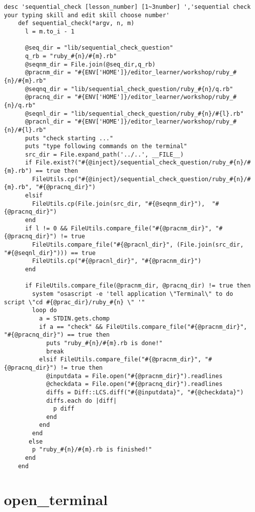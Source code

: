 \begin{verbatim}
desc 'sequential_check [lesson_number] [1~3number] ','sequential check your typing skill and edit skill choose number'
    def sequential_check(*argv, n, m)
      l = m.to_i - 1
     
      @seq_dir = "lib/sequential_check_question"
      q_rb = "ruby_#{n}/#{m}.rb"
      @seqnm_dir = File.join(@seq_dir,q_rb)
      @pracnm_dir = "#{ENV['HOME']}/editor_learner/workshop/ruby_#{n}/#{m}.rb"
      @seqnq_dir = "lib/sequential_check_question/ruby_#{n}/q.rb"
      @pracnq_dir = "#{ENV['HOME']}/editor_learner/workshop/ruby_#{n}/q.rb"      
      @seqnl_dir = "lib/sequential_check_question/ruby_#{n}/#{l}.rb"
      @pracnl_dir = "#{ENV['HOME']}/editor_learner/workshop/ruby_#{n}/#{l}.rb"      
      puts "check starting ..."
      puts "type following commands on the terminal"
      src_dir = File.expand_path('../..', __FILE__)
      if File.exist?("#{@inject}/sequential_check_question/ruby_#{n}/#{m}.rb") == true then
        FileUtils.cp("#{@inject}/sequential_check_question/ruby_#{n}/#{m}.rb", "#{@pracnq_dir}")
      elsif
        FileUtils.cp(File.join(src_dir, "#{@seqnm_dir}"),  "#{@pracnq_dir}")
      end
      if l != 0 && FileUtils.compare_file("#{@pracnm_dir}", "#{@pracnq_dir}") != true
        FileUtils.compare_file("#{@pracnl_dir}", (File.join(src_dir, "#{@seqnl_dir}"))) == true
        FileUtils.cp("#{@pracnl_dir}", "#{@pracnm_dir}")
      end
      
      if FileUtils.compare_file(@pracnm_dir, @pracnq_dir) != true then
        system "osascript -e 'tell application \"Terminal\" to do script \"cd #{@prac_dir}/ruby_#{n} \" '"
        loop do
          a = STDIN.gets.chomp
          if a == "check" && FileUtils.compare_file("#{@pracnm_dir}", "#{@pracnq_dir}") == true then
            puts "ruby_#{n}/#{m}.rb is done!"
            break
          elsif FileUtils.compare_file("#{@pracnm_dir}", "#{@pracnq_dir}") != true then
            @inputdata = File.open("#{@pracnm_dir}").readlines
            @checkdata = File.open("#{@pracnq_dir}").readlines
            diffs = Diff::LCS.diff("#{@inputdata}", "#{@checkdata}")
            diffs.each do |diff|
              p diff
            end
          end
        end
       else
        p "ruby_#{n}/#{m}.rb is finished!"
      end
    end
\end{verbatim}

    \section{open\_terminal}\label{open_terminal}

